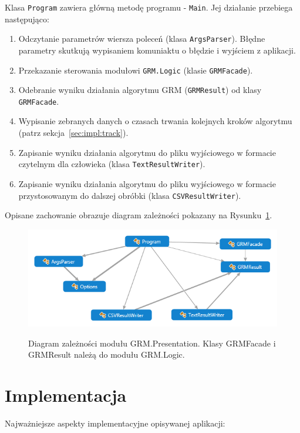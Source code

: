 \documentclass[a4paper,10pt]{article}
\begin{document}
 Klasa \verb+Program+ zawiera główną metodę programu - \verb+Main+. 
 Jej działanie przebiega następująco:
 
 \begin{enumerate}
  \item Odczytanie parametrów wiersza poleceń (klasa \verb+ArgsParser+).
  Błędne parametry skutkują wypisaniem komuniaktu o błędzie i wyjściem z aplikacji.
  \item Przekazanie sterowania modułowi \verb+GRM.Logic+ (klasie \verb+GRMFacade+).
  \item Odebranie wyniku działania algorytmu GRM (\verb+GRMResult+) od klasy \verb+GRMFacade+.
  \item Wypisanie zebranych danych o czasach trwania kolejnych kroków algorytmu (patrz sekcja~\ref{sec:impl:track}).
  \item Zapisanie wyniku działania algorytmu do pliku wyjściowego w formacie czytelnym dla człowieka (klasa \verb+TextResultWriter+).
  \item Zapisanie wyniku działania algorytmu do pliku wyjściowego w formacie przystosowanym do dalszej obróbki (klasa \verb+CSVResultWriter+).
 \end{enumerate}
 
 Opisane zachowanie obrazuje diagram zależności pokazany na Rysunku~\ref{fig:diag:pres:dep}.
 
 \begin{figure}[!ht]
  \begin{center}
   \scalebox{0.7}
   {
    \includegraphics{../diagrams/Presentation_dependency_diagram.png}
   }
  \end{center}
  \caption{
   Diagram zależności modułu GRM.Presentation.
   Klasy GRMFacade i GRMResult należą do modułu GRM.Logic.
  }
  \label{fig:diag:pres:dep}
 \end{figure}


\section{Implementacja} \label{sec:impl}
Najważniejsze aspekty implementacyjne opisywanej aplikacji:
\end{document}
